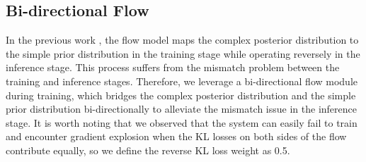 \subsection{Bi-directional Flow}
In the previous work \cite{zhou22f_interspeech}, the flow model maps the complex posterior distribution to the simple prior distribution in the training stage while operating reversely in the inference stage.
This process suffers from the mismatch problem between the training and inference stages.
Therefore, we leverage a bi-directional flow module\cite{tan2022naturalspeech} during training, which bridges the complex posterior distribution and the simple prior distribution bi-directionally to alleviate the mismatch issue in the inference stage.
It is worth noting that we observed that the system can easily fail to train and encounter gradient explosion when the KL losses on both sides of the flow contribute equally, so we define the reverse KL loss weight as 0.5.




